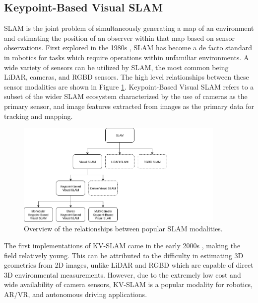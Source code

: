 \subsection{Keypoint-Based Visual SLAM}
\label{sec:kv_slam_background}

SLAM is the joint problem of simultaneously generating a map of an environment and estimating the position of an observer within that map based on sensor observations. First explored in the 1980s \cite{smithEstimatingUncertainSpatial1988}, SLAM has become a de facto standard in robotics for tasks which require operations within unfamiliar environments. A wide variety of sensors can be utilized by SLAM, the most common being LiDAR, cameras, and RGBD sensors. The high level relationships between these sensor modalities are shown in Figure \ref{fig:slam_family_tree}. Keypoint-Based Visual SLAM refers to a subset of the wider SLAM ecosystem characterized by the use of cameras as the primary sensor, and image features extracted from images as the primary data for tracking and mapping.

\begin{figure}[!ht]
    \centering
    \includegraphics[width=0.9\textwidth]{resources/slam_family_tree.png}
    \caption[SLAM Family Tree]{Overview of the relationships between popular SLAM modalities.}
    \label{fig:slam_family_tree}
\end{figure}

The first implementations of KV-SLAM came in the early 2000s \cite{seMobileRobotLocalization2002}\cite{davisonRealtimeSimultaneousLocalisation2003}, making the field relatively young. This can be attributed to the difficulty in estimating 3D geometries from 2D images, unlike LiDAR and RGBD which are capable of direct 3D environmental measurements. However, due to the extremely low cost and wide availability of camera sensors, KV-SLAM is a popular modality for robotics, AR/VR, and autonomous driving applications.

